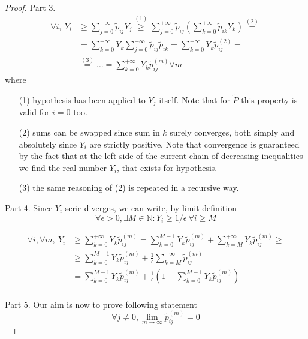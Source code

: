 \begin{proof}
		Part 3.
		\begin{equation}\begin{split}
			\forall i, ~ Y_i & \ge \sum_{j=0}^{+\infty} \tilde{p}_{ij} Y_j \stackrel{(1)}{\ge}
			\sum_{j=0}^{+\infty} \tilde{p}_{ij} \left( \sum_{k=0}^{+\infty} \tilde{p}_{ik} Y_k \right) \stackrel{(2)}{=} \\
			& = \sum_{k=0}^{+\infty} Y_k \sum_{j=0}^{+\infty} \tilde{p}_{ij}  \tilde{p}_{ik} =
			\sum_{k=0}^{+\infty} Y_k \tilde{p}_{ij}^{(2)} = \\
			& \stackrel{(3)}{=} \ldots = \sum_{k=0}^{+\infty} Y_k \tilde{p}_{ij}^{(m)} \forall m
		\end{split}\end{equation}
		where
		\begin{itemize}
			\item [(1)] hypothesis has been applied to $Y_j$ itself. Note that for $\tilde{P}$ this property is valid for $i=0$ too.
			\item [(2)] sums can be swapped since sum in $k$ surely converges, both simply and absolutely since $Y_i$ are strictly positive. Note that convergence is guaranteed by the fact that at the left side of the current chain of decreasing inequalities we find the real number $Y_i$, that exists for hypothesis.
			\item [(3)] the same reasoning of (2) is repeated in a recursive way.
		\end{itemize}

		Part 4.
		Since $Y_i$ serie diverges, we can write, by limit definition
		$$ \forall \epsilon > 0, \exists M \in \mathbb{N} : Y_i \ge 1 / \epsilon ~ \forall i \ge M$$

		\begin{equation}\begin{split}
			\forall i, \forall m, ~ Y_i & \ge \sum_{k=0}^{+\infty} Y_k \tilde{p}_{ij}^{(m)}
				= \sum_{k=0}^{M-1} Y_k \tilde{p}_{ij}^{(m)}
				+ \sum_{k=M}^{+\infty} Y_k \tilde{p}_{ij}^{(m)} \ge \\
			& \ge \sum_{k=0}^{M-1} Y_k \tilde{p}_{ij}^{(m)}
				+ \frac{1}{\epsilon} \sum_{k=M}^{+\infty} \tilde{p}_{ij}^{(m)} \\
			& = \sum_{k=0}^{M-1} Y_k \tilde{p}_{ij}^{(m)}
				+ \frac{1}{\epsilon} \left( 1 - \sum_{k=0}^{M-1} Y_k \tilde{p}_{ij}^{(m)} \right) \\
		\end{split}\end{equation}

		Part 5.
		Our aim is now to prove following statement
		$$ \forall j \neq 0, \lim_{m \to \infty} \tilde{p}_{ij}^{(m)} = 0 $$


\end{proof}
